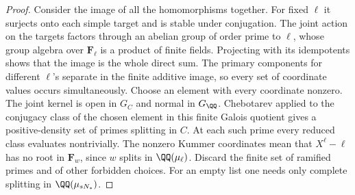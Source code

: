 \documentclass[a4paper,11pt]{article}
\theoremstyle{definition}
\theoremstyle{remark}
\numberwithin{equation}{section}
\begin{document}
\begin{proof}
Consider the image of all the homomorphisms together. For fixed
\(\ell\) it surjects onto each simple target and is stable under
conjugation. The joint action on the targets factors through an
abelian group of order prime to \(\ell\), whose group algebra
over \(\mathbf F_\ell\) is a product of finite fields. Projecting
with its idempotents shows that the image is the whole direct
sum. The primary components for different \(\ell\)'s separate
in the finite additive image, so every set of coordinate values
occurs simultaneously. Choose an element with every coordinate
nonzero. The joint kernel is open in \(G_C\) and normal in
\(G_\QQ\). Chebotarev applied to the conjugacy class of the
chosen element in this finite Galois quotient gives a
positive-density set of primes splitting in \(C\). At each such
prime every reduced class evaluates nontrivially. The nonzero
Kummer coordinates mean that \(X^\ell-\ell\) has no root in
\(\mathbf F_w\), since \(w\) splits in \(\QQ(\mu_\ell)\).
Discard the finite set of ramified primes and of other forbidden
choices. For an empty list one needs only complete splitting in
\(\QQ(\mu_{sN_*})\).
\end{proof}
\end{document}
